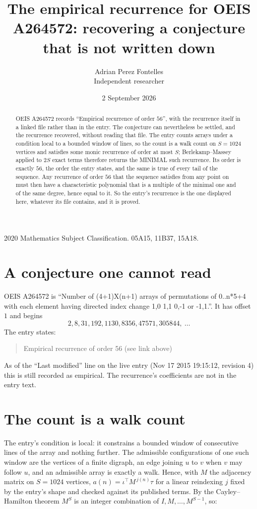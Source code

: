 \documentclass[11pt,a4paper]{article}
\title{The empirical recurrence for OEIS A264572: recovering a conjecture that is not written down}
\author{Adrian Perez Fontelles\\ \small Independent researcher}
\date{2 September 2026}
\theoremstyle{plain}
\theoremstyle{definition}
\begin{document}
\maketitle

\begin{abstract}
OEIS A264572 records ``Empirical recurrence of order $56$'', with the recurrence itself in a
linked file rather than in the entry. The conjecture can nevertheless be settled, and the
recurrence recovered, without reading that file. The entry counts arrays under a condition
local to a bounded window of lines, so the count is a walk count on $S=1024$ vertices and
satisfies some monic recurrence of order at most $S$; Berlekamp--Massey applied to $2S$ exact
terms therefore returns the MINIMAL such recurrence. Its order is exactly $56$, the order
the entry states, and the same is true of every tail of the sequence. Any recurrence of order
$56$ that the sequence satisfies from any point on must then have a characteristic
polynomial that is a multiple of the minimal one and of the same degree, hence equal to it. So
the entry's recurrence is the one displayed here, whatever its file contains, and it is
proved.
\end{abstract}

\noindent\small 2020 Mathematics Subject Classification. 05A15, 11B37, 15A18.\normalsize

\section{A conjecture one cannot read}

OEIS A264572 is ``Number of (4+1)X(n+1) arrays of permutations of 0..n*5+4 with each element having directed index change 1,0 1,1 0,-1 or -1,1.''. It has offset $1$ and begins
\[
2, 8, 31, 192, 1130, 8356, 47571, 305844,\ \dots
\]
The entry states:
\begin{quote}
Empirical recurrence of order 56 (see link above)
\end{quote}
As of the ``Last modified'' line on the live entry (Nov 17 2015 19:15:12, revision 4) this is still
recorded as empirical. The recurrence's coefficients are not in the entry text.

\section{The count is a walk count}

The entry's condition is local: it constrains a bounded window of consecutive lines of the
array and nothing further. The admissible configurations of one such window are the vertices
of a finite digraph, an edge joining $u$ to $v$ when $v$ may follow $u$, and an admissible
array is exactly a walk. Hence, with $M$ the adjacency matrix on $S=1024$ vertices,
$a(n)=\iota^{\!\top}M^{\,j(n)}\tau$ for a linear reindexing $j$ fixed by the entry's shape
and checked against its published terms. By the Cayley--Hamilton theorem $M^{S}$ is an
integer combination of $I,M,\dots,M^{S-1}$, so:
\end{document}
